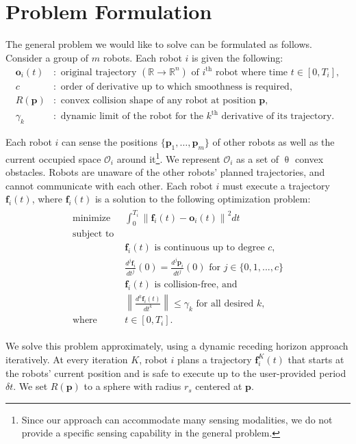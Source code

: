 \documentclass{svproc}
\newcommand{\vp}{\mathbf{p}}
\newcommand{\vf}{\mathbf{f}}
\newcommand{\vo}{\mathbf{o}}
\newcommand{\cO}{\mathcal{O}}
\newcommand{\R}{\mathbb{R}} %
\renewcommand{\th}{^{\text{th}}}
\begin{document}
\section{Problem Formulation} \label{problemFormulation}
The general problem we would like to solve can be formulated as follows. 
Consider a group of $m$ robots. Each robot $i$ is given the following:
\begin{align*}
    \vo_i(t)&:\text{ original trajectory $(\R\to \R^n)$ of $i\th$ robot where time } t\in[0,T_i],\\
    c&:\text{ order of derivative up to which smoothness is required},\\
    R(\vp)&:\text{ convex collision shape of any robot at position $\vp$},\\
    \gamma_k&: \text{ dynamic limit of the robot for the $k\th$ derivative of its trajectory}.
\end{align*}

Each robot $i$ can sense the positions $\{\vp_1,\ldots,\vp_m\}$ of other robots as well as the current occupied space $\cO_i$ around it\footnote{Since our approach can accommodate many sensing modalities, we do not provide a specific sensing capability in the general problem.}.
We represent $\cO_i$ as a set of $\uptheta$ convex obstacles.
Robots are unaware of the other robots' planned trajectories, and cannot communicate with each other.
Each robot $i$ must execute a trajectory $\vf_i(t)$, where $\vf_i(t)$ is a solution to the following optimization problem:
\begin{align}
\begin{split}
    \text{minimize } & \int_{0}^{T_i}\left\|\vf_i(t)-\vo_i(t)\right\|^2 dt\\
    \text{subject to }& \\
    &\vf_i(t) \text{ is}\text{ continuous up to degree $c$},\\
    &\frac{d^j\vf_i}{dt^j}(0) = \frac{d^j\vp_i}{dt^j}(0)\text{ for } j\in\{0,1,...,c\}\\
    &\vf_i(t)\text{ is collision-free, and}\\ 
    &\left\|\frac{d^k \vf_i(t)}{dt^k}\right\| \leq \gamma_k\text{ for all desired $k$},\\
    \text{where } & t\in [0,T_i].
\end{split}
\label{eq:problem:opt}
\end{align}

We solve this problem approximately, using a dynamic receding horizon approach iteratively.
At every iteration $K$, robot $i$ plans a trajectory $\vf^{K}_i(t)$ that starts at the robots' current position and is safe to execute up to the user-provided period $\delta t$.
We set $R(\vp)$ to a sphere with radius $r_s$ centered at $\vp$.
\end{document}
